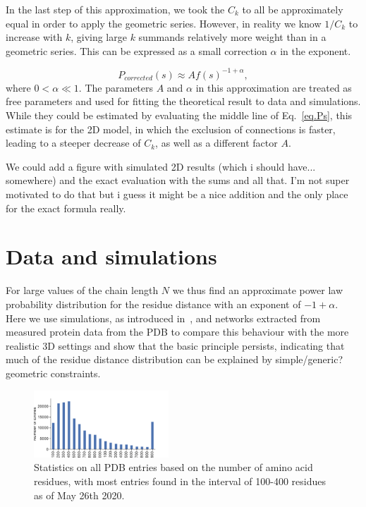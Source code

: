 \documentclass[
reprint,
twocolumn,
amsmath,amssymb,superscriptaddress,aps,
pre]{revtex4-1}
\newcommand{\red}[1]{\textcolor{red!80!black}{#1}}
\newcommand{\blue}[1]{\textcolor{blue!80!black}{#1}}
\begin{document}
In the last step of this approximation, we took the $C_k$ to all be approximately equal in order to apply the geometric series. However, in reality we know $1/C_k$ to increase with $k$, giving large $k$ summands relatively more weight than in a geometric series. This can be expressed as a small correction $\alpha$ in the exponent.

\begin{equation}
    P_{corrected}(s)\approx A f(s)^{-1+\alpha},
\end{equation}
where $0<\alpha \ll 1$. \blue{The parameters $A$ and $\alpha$ in this approximation are treated as free parameters and used for fitting the theoretical result to data and simulations. While they could be estimated by evaluating the middle line of Eq.~\ref{eq.Ps}, this estimate is for the 2D model, in which the exclusion of connections is faster, leading to a steeper decrease of $C_k$, as well as a different factor $A$.}

\red{We could add a figure with simulated 2D results (which i should have... somewhere) and the exact evaluation with the sums and all that. I'm not super motivated to do that but i guess it might be a nice addition and the only place for the exact formula really.}

\section*{Data and simulations}
For large values of the chain length $N$ we thus find an approximate power law probability distribution for the residue distance with an exponent of $-1+\alpha$. Here we use simulations, as introduced in~\cite{molkenthin2020self}, and networks extracted from measured protein data from the PDB \cite{PDB} to compare this behaviour \blue{with the more} realistic 3D settings and show that the basic principle persists, indicating that much of the residue distance distribution can be explained by simple\blue{/generic?} geometric constraints.
 \begin{figure}[h]
        \centering
	\includegraphics[width=0.45\textwidth]{paper/figures/Fig2/pdb_statistics.pdf}
        \caption{Statistics on all PDB entries based on the number of amino acid residues, with most entries found in the interval of 100-400 residues as of May 26th 2020.}
        \label{fig:pdb_stats}
\end{figure}
\end{document}
